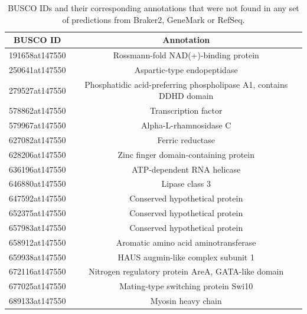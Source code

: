 \begin{table}[h]
  \centering
  \begin{tabular}{|c|c|}
    \hline
    BUSCO ID & Annotation \\ \hline
    191658at147550 & Rossmann-fold NAD(+)-binding protein \\ \hline
    250641at147550 & Aspartic-type endopeptidase \\ \hline
    279527at147550 & Phosphatidic acid-preferring phospholipase A1, contains DDHD domain \\ \hline
    578862at147550 & Transcription factor \\ \hline
    579967at147550 & Alpha-L-rhamnosidase C \\ \hline
    627082at147550 & Ferric reductase \\ \hline
    628206at147550 & Zinc finger domain-containing protein \\ \hline
    636196at147550 & ATP-dependent RNA helicase \\ \hline
    646880at147550 & Lipase class 3 \\ \hline
    647592at147550 & Conserved hypothetical protein \\ \hline
    652375at147550 & Conserved hypothetical protein \\ \hline
    657983at147550 & Conserved hypothetical protein \\ \hline
    658912at147550 & Aromatic amino acid aminotransferase \\ \hline
    659938at147550 & HAUS augmin-like complex subunit 1 \\ \hline
    672116at147550 & Nitrogen regulatory protein AreA, GATA-like domain \\ \hline
    677025at147550 & Mating-type switching protein Swi10 \\ \hline
    689133at147550 & Myosin heavy chain \\ \hline
  \end{tabular}
  \caption{BUSCO IDs and their corresponding annotations that were not found in any set of predictions from Braker2, GeneMark or RefSeq.}
  \label{table:missed-busco-all}
\end{table}

